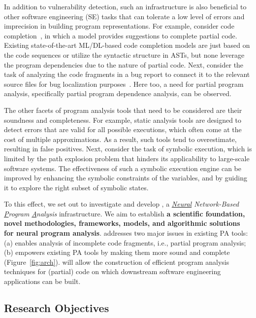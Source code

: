 In addition to vulnerability detection, such an 
infrastructure
is also beneficial to other software engineering (SE) tasks that can tolerate a low level of errors and imprecision in building program representations. For example, consider code completion~\cite{}, in which a model provides suggestions to complete partial code. Existing state-of-the-art ML/DL-based code completion models are just based on the code sequences or utilize the syntactic structure in ASTs, but none leverage the program dependencies due to the nature of partial code. Next, consider the task of analyzing the code fragments in a bug report to connect it to the relevant source files for bug localization purposes~\cite{}. Here too, a need for partial program analysis, specifically partial program dependence analysis, can be observed.

The other facets of program analysis tools that need to be considered are their soundness and completeness. For example, static analysis tools are designed to detect errors that are valid for all possible executions, which often come at the cost of multiple approximations. As a result, such tools tend to overestimate, resulting in false positives. Next, consider the task of symbolic execution, which is limited by the path explosion problem that hinders its applicability to large-scale software systems. The effectiveness of such a symbolic execution engine can be improved by enhancing the symbolic constraints of the variables, and by guiding it to explore the right subset of symbolic states. 

To this effect, we set out to investigate and develop {\tool}, a {\em \underline{Neural} Network-Based \underline{P}rogram \underline{A}nalysis} infrastructure. We aim to establish {\bf a scientific foundation, novel methodologies, frameworks, models, and algorithmic solutions for neural program analysis}. {\tool} addresses two major issues in existing PA tools: (a) enables analysis of incomplete code fragments, i.e., partial program analysis; (b) empowers existing PA tools by making them more sound and complete (Figure~\ref{fig:arch}). {\tool} will allow the construction of efficient program analysis techniques for (partial) code on which downstream software engineering applications can be built.

\subsection{Research Objectives}

